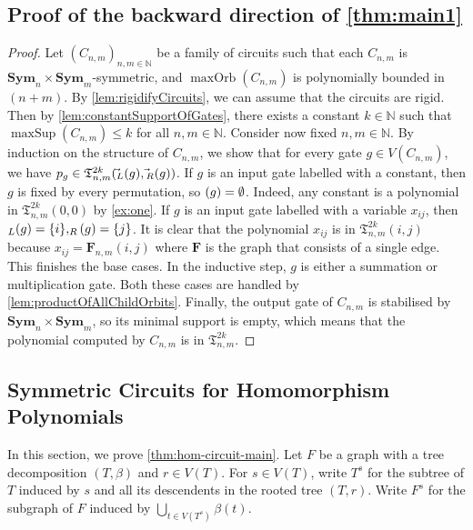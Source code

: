 \documentclass[10pt,a4paper]{article}
\theoremstyle{definition}
\theoremstyle{plain}
\theoremstyle{remark}
\newcommand{\Sym}{\mathbf{Sym}}
\newcommand{\bbN}{\mathbb{N}}
\let\sup\relax
\DeclareMathOperator{\sup}{sup}
\DeclareMathOperator{\maxOrb}{maxOrb}
\DeclareMathOperator{\maxSup}{maxSup}
\begin{document}
 	
 	\subsection{Proof of the backward direction of \cref{thm:main1}}
 	\begin{proof}
 		Let $(C_{n,m})_{n,m \in \bbN}$ be a family of circuits such that each $C_{n,m}$ is $\Sym_n \times \Sym_m$-symmetric, and $\maxOrb(C_{n,m})$ is polynomially bounded in $(n+m)$. By \cref{lem:rigidifyCircuits}, we can assume that the circuits are rigid. Then by \cref{lem:constantSupportOfGates}, there exists a constant $k \in \bbN$ such that $\maxSup(C_{n,m}) \leq k$ for all $n,m \in \bbN$. Consider now fixed $n, m \in \bbN$.
 		By induction on the structure of $C_{n,m}$, we show
                that for every gate $g \in V(C_{n,m})$, we have $p_g \in \mathfrak{T}^{2k}_{n,m}(\vec{\sup}_L(g), \vec{\sup}_R(g))$. If $g$ is an input gate labelled with a constant, then $g$ is fixed by every permutation, so $\sup(g) = \emptyset$. Indeed, any constant is a polynomial in $ \mathfrak{T}^{2k}_{n,m}(0, 0)$ by \cref{ex:one}. If $g$ is an input gate labelled with a variable $x_{ij}$, then $\sup_L(g) = \{i\}, \sup_R(g) = \{j\}$. It is clear that the polynomial $x_{ij}$ is in $\mathfrak{T}^{2k}_{n,m}(i, j)$ because $x_{ij} = \boldsymbol{F}_{n,m}(i,j)$ where $\boldsymbol{F}$ is the graph that consists of a single edge. This finishes the base cases. 
 		In the inductive step, $g$ is either a summation or multiplication gate. Both these cases are handled by \cref{lem:productOfAllChildOrbits}. Finally, the output gate of $C_{n,m}$ is stabilised by $\Sym_n \times \Sym_m$, so its minimal support is empty, which means that the polynomial computed by $C_{n,m}$ is in $\mathfrak{T}^{2k}_{n,m}$. 
 	\end{proof}	
 	
 	
 	
 	
 	
 	
 	
 	\subsection{Symmetric Circuits for Homomorphism Polynomials}
 	In this section, we prove \cref{thm:hom-circuit-main}. 	
 	Let $F$ be a graph with a tree decomposition $(T, \beta)$ and $r \in V(T)$.
 	For $s \in V(T)$, write $T^s$ for the subtree of $T$ induced by $s$ and all its descendents in the rooted tree $(T, r)$.
 	Write $F^s$ for the subgraph of $F$ induced by $\bigcup_{t \in V(T^s)} \beta(t)$.
 	
\end{document}
